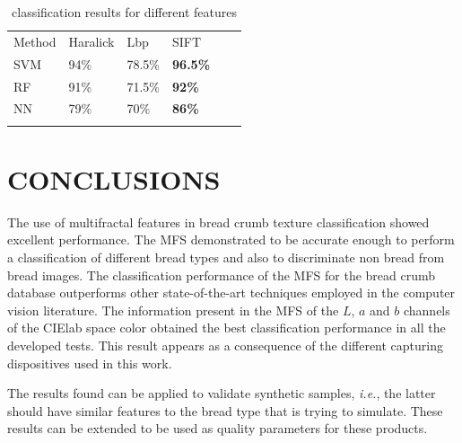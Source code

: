 \documentclass[a4paper,10pt]{article}
\begin{document}
\begin{table}
\caption{classification results for different features}
\label{tab:other}       %
\begin{tabular}{llllll}
\hline\noalign{\smallskip}
Method & Haralick & Lbp & SIFT\\ %
\noalign{\smallskip}\hline\noalign{\smallskip}
SVM & 94\% & 78.5\% & \textbf{96.5\%} \\ %
RF  & 91\% & 71.5\% & \textbf{92\%} \\ %
NN & 79\% & 70\% & \textbf{86\%} \\ %
\noalign{\smallskip}\hline
\end{tabular}
\end{table}


\section{CONCLUSIONS}
The use of multifractal features in bread crumb texture classification showed excellent performance. The MFS demonstrated to be accurate enough to perform a classification of different bread types and also to discriminate non bread from bread images. The classification performance of the MFS for the bread crumb database outperforms other state-of-the-art techniques employed in the computer vision literature. The information present in the MFS of the $L$, $a$ and $b$ channels of the CIElab space color obtained the best classification performance in all the developed tests. This result appears as a consequence of the different capturing dispositives used in this work.

The results found can be applied to validate synthetic samples, {\em i.e.}, the latter should have similar features to the bread type that is trying to simulate. These results can be extended to be used as quality parameters for these products.


\end{document}
